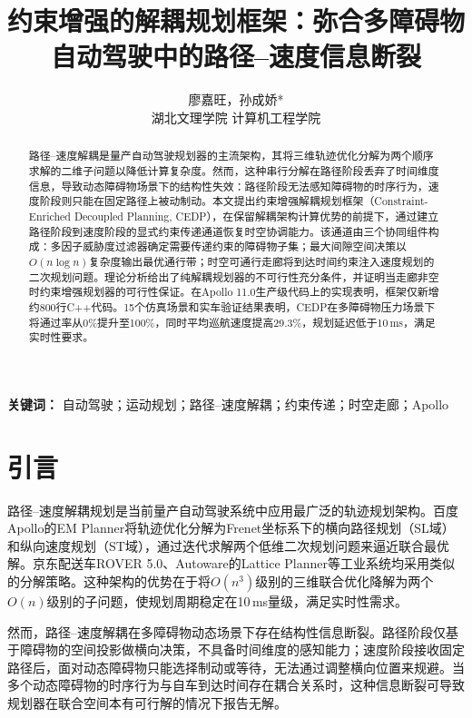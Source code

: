 \documentclass[a4paper,11pt]{article}
\title{约束增强的解耦规划框架：弥合多障碍物自动驾驶中的路径--速度信息断裂}
\author{廖嘉旺，孙成娇*\\湖北文理学院 计算机工程学院}
\date{}
\begin{document}
\maketitle

\begin{abstract}
路径--速度解耦是量产自动驾驶规划器的主流架构，其将三维轨迹优化分解为两个顺序求解的二维子问题以降低计算复杂度。然而，这种串行分解在路径阶段丢弃了时间维度信息，导致动态障碍物场景下的结构性失效：路径阶段无法感知障碍物的时序行为，速度阶段则只能在固定路径上被动制动。本文提出约束增强解耦规划框架（Constraint-Enriched Decoupled Planning, CEDP），在保留解耦架构计算优势的前提下，通过建立路径阶段到速度阶段的显式约束传递通道恢复时空协调能力。该通道由三个协同组件构成：多因子威胁度过滤器确定需要传递约束的障碍物子集；最大间隙空间决策以$O(n\log n)$复杂度输出最优通行带；时空可通行走廊将到达时间约束注入速度规划的二次规划问题。理论分析给出了纯解耦规划器的不可行性充分条件，并证明当走廊非空时约束增强规划器的可行性保证。在Apollo 11.0生产级代码上的实现表明，框架仅新增约800行C++代码。15个仿真场景和实车验证结果表明，CEDP在多障碍物压力场景下将通过率从0\%提升至100\%，同时平均巡航速度提高29.3\%，规划延迟低于10\,ms，满足实时性要求。
\end{abstract}

\textbf{关键词：} 自动驾驶；运动规划；路径--速度解耦；约束传递；时空走廊；Apollo

\section{引言}

路径--速度解耦规划是当前量产自动驾驶系统中应用最广泛的轨迹规划架构。百度Apollo的EM Planner将轨迹优化分解为Frenet坐标系下的横向路径规划（SL域）和纵向速度规划（ST域），通过迭代求解两个低维二次规划问题来逼近联合最优解。京东配送车ROVER 5.0、Autoware的Lattice Planner等工业系统均采用类似的分解策略。这种架构的优势在于将$O(n^3)$级别的三维联合优化降解为两个$O(n)$级别的子问题，使规划周期稳定在10\,ms量级，满足实时性需求。

然而，路径--速度解耦在多障碍物动态场景下存在结构性信息断裂。路径阶段仅基于障碍物的空间投影做横向决策，不具备时间维度的感知能力；速度阶段接收固定路径后，面对动态障碍物只能选择制动或等待，无法通过调整横向位置来规避。当多个动态障碍物的时序行为与自车到达时间存在耦合关系时，这种信息断裂可导致规划器在联合空间本有可行解的情况下报告无解。
\end{document}
